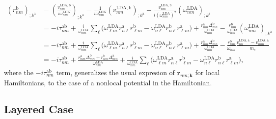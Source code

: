 \begin{align}\label{na_rgendevn}
(r^{\mathrm{b}}_{nm})_{;k^{\mathrm{a}}}
&=\left(\frac{v^{\mathrm{LDA},\mathrm{b}}_{nm}}{i\omega^\mathrm{LDA}_{nm}}\right)_{;k^{\mathrm{a}}}
=
\frac{1}
{i\omega^\mathrm{LDA}_{nm}}
\left( 
v^{\mathrm{LDA},\mathrm{b}}_{nm}
\right)_{;k^{\mathrm{a}}}
-
\frac{v^{\mathrm{LDA},\mathrm{b}}_{nm}}
{i(\omega^\mathrm{LDA}_{nm})^2}
\left(
\omega^\mathrm{LDA}_{nm}
\right)_{;k^{\mathrm{a}}}
\nonumber \\
&=
-i\tau^{\mathrm{a}\mathrm{b}}_{nm}
+
\frac{i}{\omega^\mathrm{LDA}_{nm}}
\sum_{\ell}
\bigg(
\omega^\mathrm{LDA}_{\ell m} 
r^{\mathrm{a}}_{n\ell} 
r^{\mathrm{b}}_{\ell m}
-
\omega^\mathrm{LDA}_{n\ell} 
r^{\mathrm{b}}_{n\ell} 
r^{\mathrm{a}}_{\ell m}
\bigg)
+
\frac{r^{\mathrm{a}}_{nm}
\Delta^{\mathrm{b}}_{mn}}
{\omega^\mathrm{LDA}_{nm}}
-
\frac{r^{\mathrm{b}}_{nm}}
{\omega^\mathrm{LDA}_{nm}}
\left(
\omega^\mathrm{LDA}_{nm}
\right)_{;k^{\mathrm{a}}}
\nonumber \\
&=
-i\tau^{\mathrm{a}\mathrm{b}}_{nm}
+
\frac{i}{\omega^\mathrm{LDA}_{nm}}
\sum_{\ell}
\bigg(
\omega^\mathrm{LDA}_{\ell m} 
r^{\mathrm{a}}_{n\ell} 
r^{\mathrm{b}}_{\ell m}
-
\omega^\mathrm{LDA}_{n\ell} 
r^{\mathrm{b}}_{n\ell} 
r^{\mathrm{a}}_{\ell m}
\bigg)
+
\frac{r^{\mathrm{a}}_{nm}
\Delta^{\mathrm{b}}_{mn}}
{\omega^\mathrm{LDA}_{nm}}
-
\frac{r^{\mathrm{b}}_{nm}}
{\omega_{nm}}
\frac{v^{\mathrm{LDA},\mathrm{a}}_{nn}-v^{\mathrm{LDA},\mathrm{a}}_{mm}}{m_e}
\nonumber \\
&=
-i\tau^{\mathrm{a}\mathrm{b}}_{nm}
+
\frac{ 
r^{\mathrm{a}}_{nm}
\Delta^{\mathrm{b}}_{mn}
+r^{\mathrm{b}}_{nm}
\Delta^{\mathrm{a}}_{mn}
}
{\omega^\mathrm{LDA}_{nm}}
+
\frac{i}{\omega^\mathrm{LDA}_{nm}}
\sum_{\ell}
\bigg(
\omega^\mathrm{LDA}_{\ell m} 
r^{\mathrm{a}}_{n\ell} 
r^{\mathrm{b}}_{\ell m}
-
\omega^\mathrm{LDA}_{n\ell} 
r^{\mathrm{b}}_{n\ell} 
r^{\mathrm{a}}_{\ell m}
\bigg)
,
\end{align} 
where the $-i\tau^{\mathrm{a}\mathrm{b}}_{nm}$ term, generalizes the usual expresion of
$\mathbf{r}_{nm;\mathbf{k}}$ for local 
Hamiltonians,\cite{aversaPRB95,nastosPRB05,cabellosPRB09,rashkeevPRB98}
to
the case of a
nonlocal potential in the Hamiltonian.



\subsection{Layered Case}

